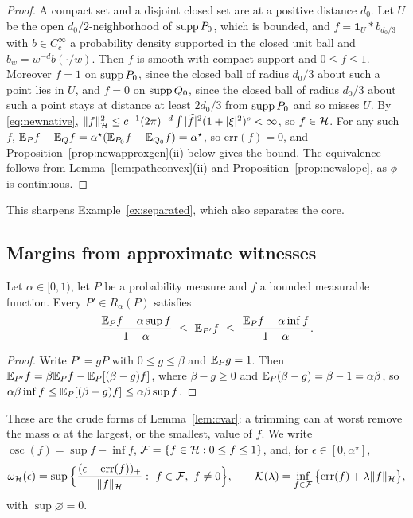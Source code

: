 \begin{proof}
A compact set and a disjoint closed set are at a positive distance $d_0$. Let $U$ be the open
$d_0/2$-neighborhood of $\operatorname{supp} P_0$, which is bounded, and $f=\mathbf 1_U*b_{d_0/3}$ with $b\in C_c^\infty$ a
probability density supported in the closed unit ball and $b_w=w^{-d}b(\cdot/w)$. Then $f$ is smooth with compact
support and $0\le f\le1$. Moreover $f=1$ on $\operatorname{supp} P_0$, since the closed ball of radius $d_0/3$ about such a point lies in $U$,
and $f=0$ on $\operatorname{supp} Q_0$, since the closed ball of radius $d_0/3$ about such a point stays at distance at least
$2d_0/3$ from $\operatorname{supp} P_0$ and so misses $U$. By \eqref{eq:newnative},
$\|f\|_{\mathcal{H}}^2\le c^{-1}(2\pi)^{-d}\int|\widehat f|^2(1+|\xi|^2)^s<\infty$, so $f\in\mathcal{H}$. For any such $f$,
$\mathbb{E}_Pf-\mathbb{E}_Qf=\alpha^\star(\mathbb{E}_{P_0}f-\mathbb{E}_{Q_0}f)=\alpha^\star$, so $\mathrm{err}(f)=0$, and Proposition~\ref{prop:newapproxgen}(ii)
below gives the bound. The equivalence follows from Lemma~\ref{lem:pathconvex}(ii) and
Proposition~\ref{prop:newslope}, as $\phi$ is continuous.
\end{proof}

This sharpens Example~\ref{ex:separated}, which also separates the core.

\subsection{Margins from approximate witnesses}

\begin{lemma}
\label{lem:newtrimmean}
Let $\alpha\in[0,1)$, let $P$ be a probability measure and $f$ a bounded measurable function. Every
$P'\in R_\alpha(P)$ satisfies
\[
\frac{\mathbb{E}_Pf-\alpha\sup f}{1-\alpha}\ \le\ \mathbb{E}_{P'}f\ \le\ \frac{\mathbb{E}_Pf-\alpha\inf f}{1-\alpha} .
\]
\end{lemma}

\begin{proof}
Write $P'=gP$ with $0\le g\le\beta$ and $\mathbb{E}_Pg=1$. Then $\mathbb{E}_{P'}f=\beta\mathbb{E}_Pf-\mathbb{E}_P[(\beta-g)f]$, where $\beta-g\ge0$ and
$\mathbb{E}_P(\beta-g)=\beta-1=\alpha\beta$, so $\alpha\beta\inf f\le\mathbb{E}_P[(\beta-g)f]\le\alpha\beta\sup f$.
\end{proof}

These are the crude forms of Lemma~\ref{lem:cvar}: a trimming can at worst remove the mass $\alpha$ at the largest, or
the smallest, value of $f$. We write $\operatorname{osc}(f)=\sup f-\inf f$, $\mathcal F=\{f\in\mathcal{H}:0\le f\le1\}$, and, for
$\epsilon\in[0,\alpha^\star]$,
\[
\omega_\Hh(\epsilon)=\sup\Big\{\frac{(\epsilon-\mathrm{err}(f))_+}{\|f\|_\Hh}:\ f\in\mathcal F,\ f\neq0\Big\},
\qquad
\mathcal K(\lambda)=\inf_{f\in\mathcal F}\big\{\mathrm{err}(f)+\lambda\|f\|_\Hh\big\} ,
\]
with $\sup\varnothing=0$.

